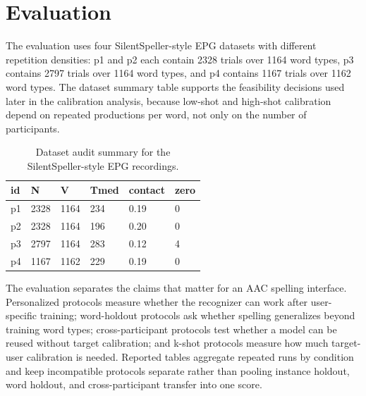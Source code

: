 
\section{Evaluation}
The evaluation uses four SilentSpeller-style EPG datasets with different repetition densities: p1 and p2 each contain 2328 trials over 1164 word types, p3 contains 2797 trials over 1164 word types, and p4 contains 1167 trials over 1162 word types. The dataset summary table supports the feasibility decisions used later in the calibration analysis, because low-shot and high-shot calibration depend on repeated productions per word, not only on the number of participants.


\begin{table}[t]
\centering
\caption{Dataset audit summary for the SilentSpeller-style EPG recordings.}
\label{tab:dataset_summary}
\begin{tabular}{llllll}
\hline
id & N & V & Tmed & contact & zero \\
\hline
p1 & 2328 & 1164 & 234 & 0.19 & 0 \\
p2 & 2328 & 1164 & 196 & 0.20 & 0 \\
p3 & 2797 & 1164 & 283 & 0.12 & 4 \\
p4 & 1167 & 1162 & 229 & 0.19 & 0 \\
\hline
\end{tabular}
\end{table}

The evaluation separates the claims that matter for an AAC spelling interface. Personalized protocols measure whether the recognizer can work after user-specific training; word-holdout protocols ask whether spelling generalizes beyond training word types; cross-participant protocols test whether a model can be reused without target calibration; and k-shot protocols measure how much target-user calibration is needed. Reported tables aggregate repeated runs by condition and keep incompatible protocols separate rather than pooling instance holdout, word holdout, and cross-participant transfer into one score.

